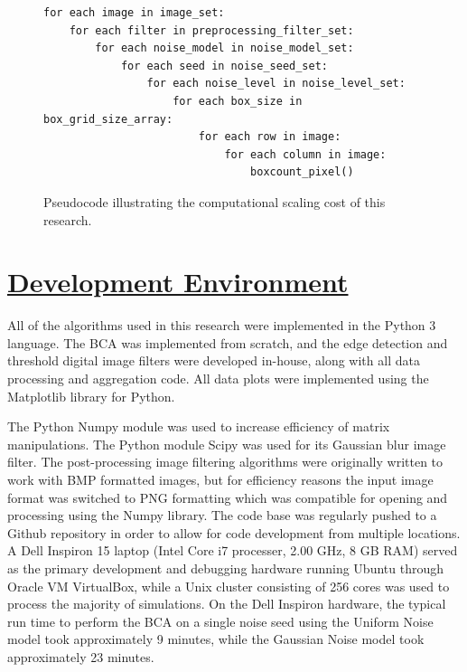 \documentclass[12pt, oneside]{book}
\begin{document}
\begin{figure}
\begin{lstlisting}
for each image in image_set:
    for each filter in preprocessing_filter_set:
        for each noise_model in noise_model_set:
            for each seed in noise_seed_set:
                for each noise_level in noise_level_set:
                    for each box_size in box_grid_size_array:
                        for each row in image:
                            for each column in image:
                                boxcount_pixel()
\end{lstlisting}
\caption{Pseudocode illustrating the computational scaling cost of this research.}
\label{fig:code_pipeline}
\end{figure}

% 
%
\section{\underline{Development Environment}}
All of the algorithms used in this research were implemented in the Python 3 language.  The BCA was implemented from scratch, and the edge detection and threshold digital image filters were developed in-house, along with all data processing and aggregation code.  All data plots were implemented using the Matplotlib library for Python.

The Python Numpy module was used to increase efficiency of matrix manipulations.  The Python module Scipy was used for its Gaussian blur image filter.  The post-processing image filtering algorithms were originally written to work with BMP formatted images, but for efficiency reasons the input image format was switched to PNG formatting which was compatible for opening and processing using the Numpy library. 
The code base was regularly pushed to a Github repository in order to allow for code development from multiple locations.  A Dell Inspiron 15 laptop (Intel Core i7 processer, 2.00 GHz, 8 GB RAM) served as the primary development and debugging hardware running Ubuntu through Oracle VM VirtualBox, while a Unix cluster consisting of 256 cores was used to process the majority of simulations.  On the Dell Inspiron hardware, the typical run time to perform the BCA on a single noise seed using the Uniform Noise model took approximately 9 minutes, while the Gaussian Noise model took approximately 23 minutes.
\end{document}
